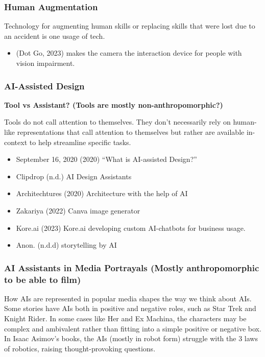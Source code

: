\documentclass[
  letterpaper,
  DIV=11,
  numbers=noendperiod]{scrartcl}
\providecommand{\tightlist}{%
  \setlength{\itemsep}{0pt}\setlength{\parskip}{0pt}}\usepackage{longtable,booktabs,array}
\begin{document}
\subsubsection{Human Augmentation}\label{human-augmentation}

Technology for augmenting human skills or replacing skills that were
lost due to an accident is one usage of tech.

\begin{itemize}
\tightlist
\item
  (Dot Go, 2023) makes the camera the interaction device for people with
  vision impairment.
\end{itemize}

\subsubsection{AI-Assisted Design}\label{ai-assisted-design}

\textbf{Tool vs Assistant? (Tools are mostly non-anthropomorphic?)}

Tools do not call attention to themselves. They don't necessarily rely
on human-like representations that call attention to themselves but
rather are available in-context to help streamline specific tasks.

\begin{itemize}
\tightlist
\item
  September 16, 2020 (2020) ``What is AI-assisted Design?''
\item
  Clipdrop (n.d.) AI Design Assistants
\item
  Architechtures (2020) Architecture with the help of AI
\item
  Zakariya (2022) Canva image generator
\item
  Kore.ai (2023) Kore.ai developing custom AI-chatbots for business
  usage.
\item
  Anon. (n.d.d) storytelling by AI
\end{itemize}

\subsubsection{AI Assistants in Media Portrayals (Mostly anthropomorphic
to be able to
film)}\label{ai-assistants-in-media-portrayals-mostly-anthropomorphic-to-be-able-to-film}

How AIs are represented in popular media shapes the way we think about
AIs. Some stories have AIs both in positive and negative roles, such as
Star Trek and Knight Rider. In some cases like Her and Ex Machina, the
characters may be complex and ambivalent rather than fitting into a
simple positive or negative box. In Isaac Asimov's books, the AIs
(mostly in robot form) struggle with the 3 laws of robotics, raising
thought-provoking questions.
\end{document}
